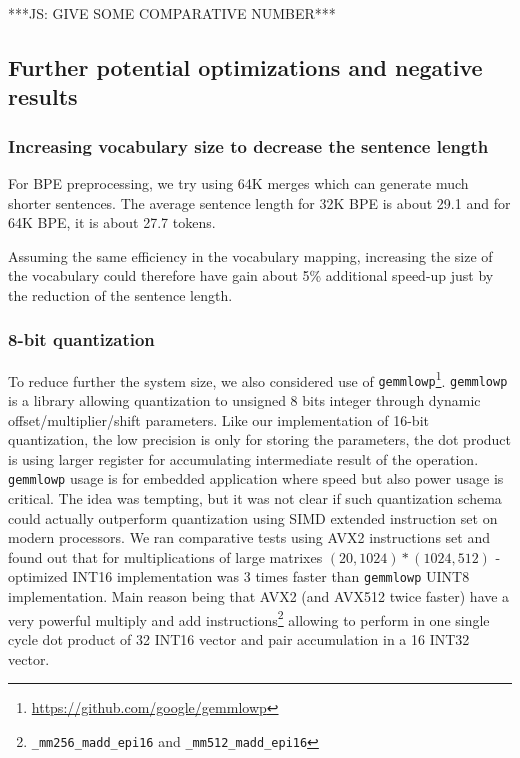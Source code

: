 \documentclass[11pt,a4paper]{article}
\begin{document}
***JS: GIVE SOME COMPARATIVE NUMBER***

\subsection{Further potential optimizations and negative results}

\subsubsection{Increasing vocabulary size to decrease the sentence length}
For BPE preprocessing, we try using 64K merges which can generate much shorter sentences.
The average sentence length for 32K BPE is about 29.1 and for 64K BPE, it is about 27.7 tokens.

Assuming the same efficiency in the vocabulary mapping, increasing the size of the vocabulary could therefore have gain about 5\% additional speed-up just by the reduction of the sentence length.

\subsubsection{8-bit quantization}

To reduce further the system size, we also considered use of {\tt gemmlowp}\footnote{\url{https://github.com/google/gemmlowp}}. {\tt gemmlowp} is a library allowing quantization to unsigned 8 bits integer through dynamic offset/multiplier/shift parameters. Like our implementation of 16-bit quantization, the low precision is only for storing the parameters, the dot product is using larger register for accumulating intermediate result of the operation. {\tt gemmlowp} usage is for embedded application where speed but also power usage is critical. The idea was tempting, but it was not clear if such quantization schema could actually outperform quantization using SIMD extended instruction set on modern processors. We ran  comparative tests using AVX2 instructions set and found out that for multiplications of large matrixes $(20,1024) * (1024,512)$ - optimized INT16 implementation was 3 times faster than  {\tt gemmlowp} UINT8 implementation. Main reason being that AVX2 (and AVX512 twice faster) have a very powerful multiply and add instructions\footnote{{\tt \_mm256\_madd\_epi16} and {\tt \_mm512\_madd\_epi16}} allowing to perform in one single cycle dot product of 32 INT16 vector and pair accumulation in a 16 INT32 vector.

\end{document}
